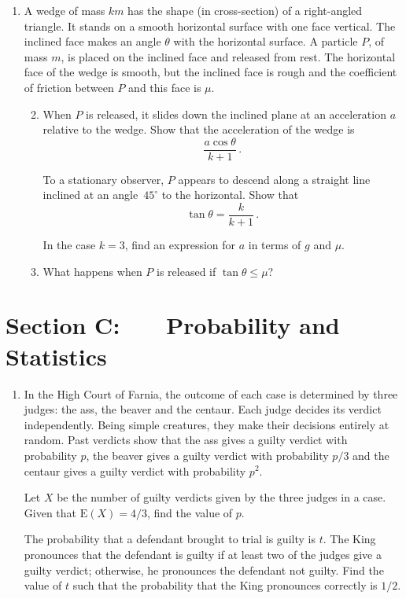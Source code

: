 \documentclass[a4, 11pt]{report}
\newlength{\qspace}
\newcounter{qnumber}
\newenvironment{question}%
 {\vspace{\qspace}
  \begin{enumerate}[\bfseries 1\quad][10]%
    \setcounter{enumi}{\value{qnumber}}%
    \item%
 }
{
  \end{enumerate}
  \filbreak
  \stepcounter{qnumber}
 }
\newenvironment{questionparts}[1][1]%
 {
  \begin{enumerate}[\bfseries (i)]%
    \setcounter{enumii}{#1}
    \addtocounter{enumii}{-1}
    \setlength{\itemsep}{5mm}
    \setlength{\parskip}{8pt}
 }
 {
  \end{enumerate}
 }
\def\E{{\mathrm E}}
\def\le{\leqslant}
\begin{document}

\begin{question}
A wedge of mass $km$ has the shape (in cross-section) of a right-angled
triangle. It stands on a smooth horizontal surface with one face
vertical. The inclined face makes an angle $\theta$ with the 
horizontal surface.
A particle $P$, of mass $m$, is placed on
the inclined face and released from rest. 
The horizontal face of the wedge
is smooth, but the inclined face is rough
and the coefficient of friction between $P$ and 
this face is $\mu$.

\begin{questionparts}
\item When
$P$ is released, it slides down the inclined
plane at an acceleration $a$ relative to the wedge. Show that
the acceleration of the wedge is 
\[
\frac {a \cos\theta}{k+1}\,.
\]

 To a
stationary observer, $P$ appears to descend along a straight line
inclined at an angle~$45^\circ$ to the horizontal. Show that
\[
\tan\theta = \frac k {k+1}\,.
\]


In the case $k=3$, find an expression for $a$ in terms of $g$ and $\mu$.
 

\item What happens when $P$ is released if $\tan\theta \le \mu$?
\end{questionparts}
\end{question}
	

	
	\newpage
\section*{Section C: \ \ \ Probability and Statistics}


\begin{question}
In the High Court of  Farnia, the outcome of each case
is determined by three judges: the ass, the beaver and the centaur.
Each judge decides its verdict independently. Being simple
creatures,
they make their decisions entirely at random. Past verdicts show that 
the ass gives a guilty verdict with probability $p$, the beaver
gives a guilty verdict with probability $p/3$ and the  
centaur gives a guilty verdict with probability $p^2$. 

Let $X$ be the number of guilty verdicts given by the three judges in
a case. Given
that $\E(X)= 4/3$, find the value of $p$.

The probability that a defendant brought to trial is guilty is 
$t$. The King
pronounces that the defendant is guilty if at least two of the judges
give a guilty verdict; otherwise, he pronounces the defendant not
guilty.
Find the value of $t$ such that the probability that the King
pronounces
correctly is $1/2$.
\end{question}
\end{document}
